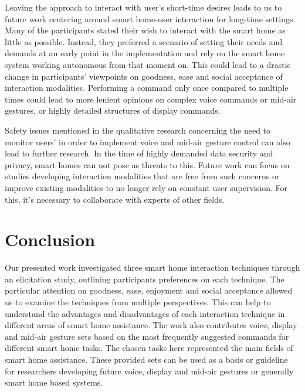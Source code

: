 \documentclass[sigchi]{acmart}
\begin{document}
	Leaving the approach to interact with user's short-time desires leads to us to future work centering around smart home-user interaction for long-time settings. Many of the participants stated their wish to interact with the smart home as little as possible. Instead, they preferred a scenario of setting their needs and demands at an early point in the implementation and rely on the smart home system working autonomous from that moment on. This could lead to a drastic change in participants' viewpoints on goodness, ease and social acceptance of interaction modalities. Performing a command only once compared to multiple times could lead to more lenient opinions on complex voice commands or mid-air gestures, or highly detailed structures of display commands.
	
	Safety issues mentioned in the qualitative research concerning the need to monitor users' in order to implement voice and mid-air gesture control can also lead to further research. In the time of highly demanded data security and privacy, smart homes can not pose as threats to this. Future work can focus on studies developing interaction modalities that are free from such concerns or improve existing modalities to no longer rely on constant user supervision. For this, it's necessary to collaborate with experts of other fields.
	
	\section{Conclusion}
	Our presented work investigated three smart home interaction techniques through an elicitation study, outlining participants preferences on each technique. The particular attention on goodness, ease, enjoyment and social acceptance allowed us to examine the techniques from multiple perspectives. This can help to understand the advantages and disadvantages of each interaction technique in different areas of smart home assistance. The work also contributes voice, display and mid-air gesture sets based on the most frequently suggested commands for different smart home tasks. The chosen tasks here represented the main fields of smart home assistance. These provided sets can be used as a basis or guideline for researchers developing future voice, display and mid-air gestures or generally smart home based systems. 
	
	
	
	
	
\end{document}
